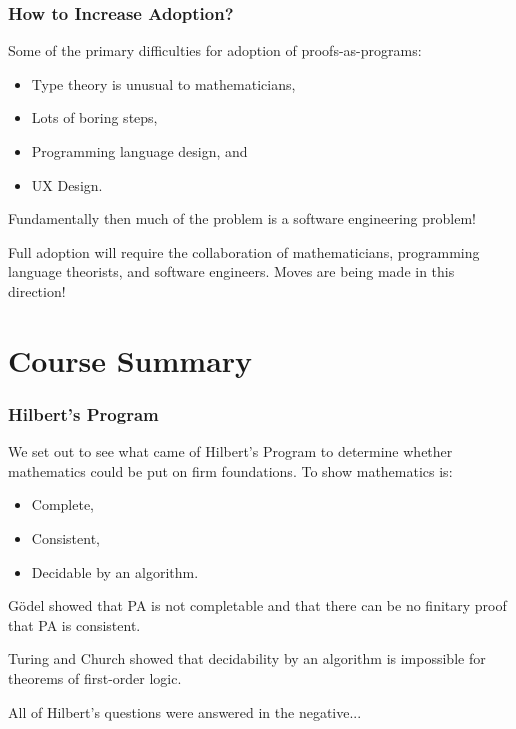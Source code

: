 \documentclass{beamer}
\theoremstyle{indentDefn} \newtheorem{defn}[]{Definition}
\begin{document}
\begin{frame}
  \frametitle{How to Increase Adoption?}

  Some of the primary difficulties for adoption of proofs-as-programs:

  \begin{itemize}
    \item Type theory is unusual to mathematicians, 
    \item Lots of boring steps,
    \item Programming language design, and 
    \item UX Design.
  \end{itemize}

  Fundamentally then much of the problem is a software engineering problem! 

  Full adoption will require the collaboration of mathematicians, programming language theorists, and software engineers. Moves are being made in this direction!

  
  \vspace{30mm}

\end{frame}

\section{Course Summary}

\begin{frame}
  \frametitle{Hilbert's Program}

  We set out to see what came of Hilbert's Program to determine whether mathematics could be put on firm foundations. To show mathematics is: 

  \begin{itemize}
    \item Complete,
    \item Consistent, 
    \item Decidable by an algorithm. 
  \end{itemize}

  G\"{o}del showed that PA is not completable and that there can be no finitary proof that PA is consistent. 

  Turing and Church showed that decidability by an algorithm is impossible for theorems of first-order logic. 

  All of Hilbert's questions were answered in the negative... 
\end{frame}
\end{document}
